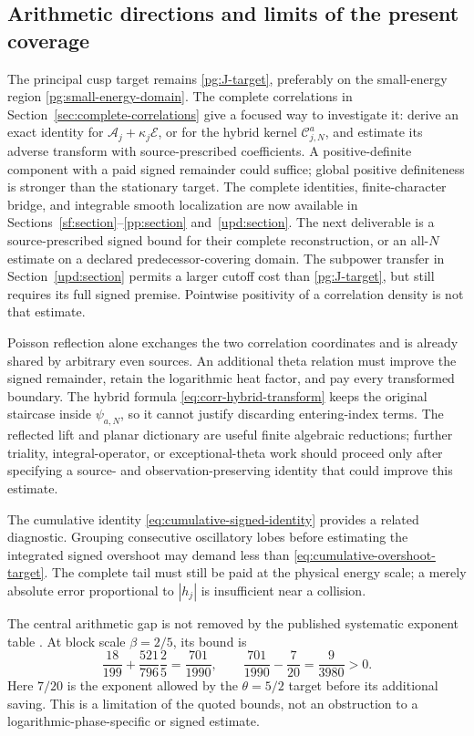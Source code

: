 \documentclass[11pt]{article}
\numberwithin{equation}{section}
\theoremstyle{definition}
\theoremstyle{remark}
\begin{document}
\subsection{Arithmetic directions and limits of the present coverage}

The principal cusp target remains \eqref{pg:J-target}, preferably on
the small-energy region \eqref{pg:small-energy-domain}. The complete
correlations in Section~\ref{sec:complete-correlations} give a focused
way to investigate it: derive an exact identity for
$\mathscr A_j+\kappa_j\mathscr E$, or for the hybrid kernel
$\mathscr C_{j,N}^{a}$, and estimate its adverse transform with
source-prescribed coefficients. A positive-definite component with a
paid signed remainder could suffice; global positive definiteness is
stronger than the stationary target. The complete identities, finite-character bridge, and integrable smooth
localization are now available in Sections~\ref{sf:section}--\ref{pp:section}
and~\ref{upd:section}. The next deliverable is a source-prescribed signed
bound for their complete reconstruction, or an all-$N$ estimate on a
declared predecessor-covering domain. The subpower transfer in
Section~\ref{upd:section} permits a larger cutoff cost than
\eqref{pg:J-target}, but still requires its full signed premise. Pointwise positivity of a correlation density
is not that estimate.

Poisson reflection alone exchanges the two correlation coordinates
and is already shared by arbitrary even sources. An additional theta
relation must improve the signed remainder, retain the logarithmic
heat factor, and pay every transformed boundary. The hybrid formula
\eqref{eq:corr-hybrid-transform} keeps the original staircase inside
$\psi_{a,N}$, so it cannot justify discarding entering-index terms.
The reflected lift and planar dictionary are useful finite algebraic
reductions; further triality, integral-operator, or exceptional-theta
work should proceed only after specifying a source- and
observation-preserving identity that could improve this estimate.

The cumulative identity \eqref{eq:cumulative-signed-identity}
provides a related diagnostic. Grouping consecutive oscillatory lobes
before estimating the integrated signed overshoot may demand less than
\eqref{eq:cumulative-overshoot-target}. The complete tail must still be
paid at the physical energy scale; a merely absolute error proportional
to $|h_j|$ is insufficient near a collision.

The central arithmetic gap is not removed by the published systematic
exponent table \cite[Table 1]{taotrudgianyang25}. At block scale
$\beta=2/5$, its bound is
\[
 \frac{18}{199}+\frac{521}{796}\frac25=\frac{701}{1990},
 \qquad \frac{701}{1990}-\frac7{20}=\frac9{3980}>0.
\]
Here $7/20$ is the exponent allowed by the $\theta=5/2$ target before
its additional saving. This is a limitation of the quoted bounds, not
an obstruction to a logarithmic-phase-specific or signed estimate.
\end{document}
